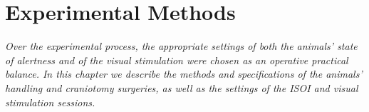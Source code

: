 \chapter{Experimental Methods}
\label{cap:ExperimentalMethods}

\textit{Over the experimental process, the appropriate settings of both the animals' state of alertness and of the visual stimulation were chosen as an operative practical balance. In this chapter we describe the methods and specifications of the animals' handling and craniotomy surgeries, as well as the settings of the ISOI and visual stimulation sessions.}






\cleardoublepage